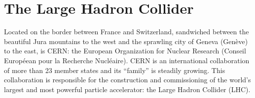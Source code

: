 \chapter{The Large Hadron Collider}
\label{ch:lhc}

Located on the border between France and Switzerland, sandwiched between the beautiful Jura mountains to the west and the sprawling city of Geneva (Genève) to the east, is CERN:
the European Organization for Nuclear Research 
(Conseil Européean pour la Recherche Nucléaire).
CERN is an international collaboration of more than 23 member states and its ``family'' is steadily growing.
This collaboration is responsible for the construction and commissioning of the world's largest and most powerful particle accelerator:
the Large Hadron Collider (LHC).

